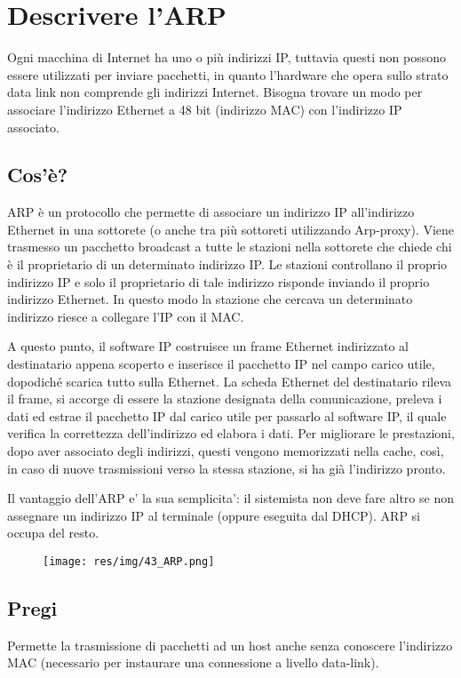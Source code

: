 \section{Descrivere l'ARP}
Ogni macchina di Internet ha uno o più indirizzi IP, tuttavia questi non possono essere utilizzati per inviare pacchetti, in quanto l'hardware che opera sullo strato data link non comprende gli indirizzi Internet.
Bisogna trovare un modo per associare l'indirizzo Ethernet a 48 bit (indirizzo MAC) con l'indirizzo IP associato.
\subsection{Cos'è?}
ARP è un protocollo che permette di associare un indirizzo IP all'indirizzo Ethernet in una sottorete (o anche tra più sottoreti utilizzando Arp-proxy).
Viene trasmesso un pacchetto broadcast a tutte le stazioni nella sottorete che chiede chi è il proprietario di un determinato indirizzo IP. Le stazioni controllano il proprio indirizzo IP e solo il proprietario di tale indirizzo risponde inviando il proprio indirizzo Ethernet. In questo modo la stazione che cercava un determinato indirizzo riesce a collegare l'IP con il MAC.

A questo punto, il software IP costruisce un frame Ethernet indirizzato al destinatario appena scoperto e inserisce il pacchetto IP nel campo carico utile, dopodiché scarica tutto sulla Ethernet. 
La scheda Ethernet del destinatario rileva il frame, si accorge di essere la stazione designata della comunicazione, preleva i dati ed estrae il pacchetto IP dal carico utile per passarlo al software IP, il quale verifica la correttezza dell'indirizzo ed elabora i dati.
Per migliorare le prestazioni, dopo aver associato degli indirizzi, questi vengono memorizzati nella cache, così, in caso di nuove trasmissioni verso la stessa stazione, si ha già l'indirizzo pronto.

Il vantaggio dell'ARP e' la sua semplicita': il sistemista non deve fare altro se non assegnare un indirizzo IP al terminale (oppure eseguita dal DHCP). ARP si occupa del resto.

\begin{figure}[H]
\centering
\texttt{[image: res/img/43\_ARP.png]}
\end{figure}
\subsection{Pregi}
Permette la trasmissione di pacchetti ad un host anche senza conoscere l'indirizzo MAC (necessario per instaurare una connessione a livello data-link).
